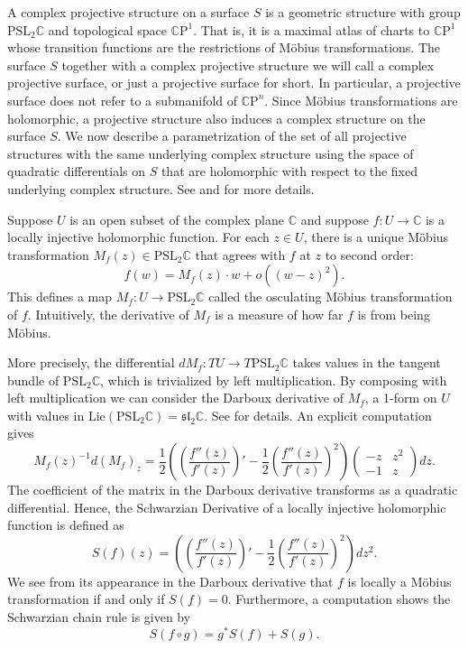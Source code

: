 \documentclass{amsart}
\newcommand{\C}{\mathbb{C}}
\newcommand{\CP}{\mathbb{C}\mathrm{P}}
\begin{document}
A complex projective structure on a surface $S$ is a geometric structure with group $\mathrm{PSL}_2 \C$ and topological space $\CP^1$.
That is, it is a maximal atlas of charts to $\CP^1$ whose transition functions are the restrictions of M\"obius transformations.
The surface $S$ together with a complex projective structure we will call a complex projective surface, or just a projective surface for short. 
In particular, a projective surface does not refer to a submanifold of $\CP^n$.
Since M\"obius transformations are holomorphic, a projective structure also induces a complex structure on the surface $S$.
We now describe a parametrization of the set of all projective structures with the same underlying complex structure using the space of quadratic differentials on $S$ that are holomorphic with respect to the fixed underlying complex structure. 
See \cite{thurston1986} and \cite{dumas2009} for more details.


Suppose $U$ is an open subset of the complex plane $\C$ and suppose $f: U \to \C$ is a locally injective holomorphic function.
For each $z \in U$, there is a unique M\"obius transformation $M_f(z) \in \mathrm{PSL}_2\C$ that agrees with $f$ at $z$ to second order:
\[
f(w) = M_f(z) \cdot w + o( (w-z)^2).
\]
This defines a map $M_f: U \to \mathrm{PSL}_2\C$ called the osculating M\"obius transformation of $f$.
Intuitively, the derivative of $M_f$ is a measure of how far $f$ is from being M\"obius.

More precisely, the differential $d M_f: TU \to T \mathrm{PSL}_2\C$ takes values in the tangent bundle of $\mathrm{PSL}_2\C$, which is trivialized by left multiplication. 
By composing with left multiplication we can consider the Darboux derivative of $M_f$, a 1-form on $U$ with values in $\mathrm{Lie}(\mathrm{PSL}_2\C) = \mathfrak{sl}_2 \C$. See \cite{sharpe1997} for details.
An explicit computation gives
\[
M_f(z)^{-1} d(M_f)_z = \frac{1}{2} \left( \left( \frac{f''(z)}{f'(z)} \right)' - \frac{1}{2} \left( \frac{f''(z)}{f'(z)} \right)^2 \right)
\begin{pmatrix}
-z & z^2 \\
-1 & z 
\end{pmatrix}
dz.
\]
The coefficient of the matrix in the Darboux derivative transforms as a quadratic differential. 
Hence, the Schwarzian Derivative of a locally injective holomorphic function is defined as 
\[
S(f)(z) = \left( \left( \frac{f''(z)}{f'(z)} \right)' - \frac{1}{2} \left( \frac{f''(z)}{f'(z)} \right)^2 \right) dz^2.
\]
We see from its appearance in the Darboux derivative that $f$ is locally a M\"obius transformation if and only if $S(f) = 0$.
Furthermore, a computation shows the Schwarzian chain rule is given by
\[
S(f \circ g) = g^* S(f) + S(g).
\]
\end{document}

